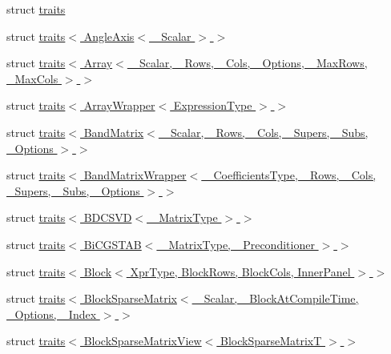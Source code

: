 \begin{DoxyCompactItemize}
\item 
struct \hyperlink{struct_eigen_1_1internal_1_1traits}{traits}
\item 
struct \hyperlink{struct_eigen_1_1internal_1_1traits_3_01_angle_axis_3_01___scalar_01_4_01_4}{traits$<$ Angle\+Axis$<$ \+\_\+\+Scalar $>$ $>$}
\item 
struct \hyperlink{struct_eigen_1_1internal_1_1traits_3_01_array_3_01___scalar_00_01___rows_00_01___cols_00_01___ope9eba6bf714e124241d092a6dc222cb7}{traits$<$ Array$<$ \+\_\+\+Scalar, \+\_\+\+Rows, \+\_\+\+Cols, \+\_\+\+Options, \+\_\+\+Max\+Rows, \+\_\+\+Max\+Cols $>$ $>$}
\item 
struct \hyperlink{struct_eigen_1_1internal_1_1traits_3_01_array_wrapper_3_01_expression_type_01_4_01_4}{traits$<$ Array\+Wrapper$<$ Expression\+Type $>$ $>$}
\item 
struct \hyperlink{struct_eigen_1_1internal_1_1traits_3_01_band_matrix_3_01___scalar_00_01___rows_00_01___cols_00_03762db5085b3b9896d5a124beda4837b}{traits$<$ Band\+Matrix$<$ \+\_\+\+Scalar, \+\_\+\+Rows, \+\_\+\+Cols, \+\_\+\+Supers, \+\_\+\+Subs, \+\_\+\+Options $>$ $>$}
\item 
struct \hyperlink{struct_eigen_1_1internal_1_1traits_3_01_band_matrix_wrapper_3_01___coefficients_type_00_01___row768e2717402a9eceb38d536f65ceb4f1}{traits$<$ Band\+Matrix\+Wrapper$<$ \+\_\+\+Coefficients\+Type, \+\_\+\+Rows, \+\_\+\+Cols, \+\_\+\+Supers, \+\_\+\+Subs, \+\_\+\+Options $>$ $>$}
\item 
struct \hyperlink{struct_eigen_1_1internal_1_1traits_3_01_b_d_c_s_v_d_3_01___matrix_type_01_4_01_4}{traits$<$ B\+D\+C\+S\+V\+D$<$ \+\_\+\+Matrix\+Type $>$ $>$}
\item 
struct \hyperlink{struct_eigen_1_1internal_1_1traits_3_01_bi_c_g_s_t_a_b_3_01___matrix_type_00_01___preconditioner_01_4_01_4}{traits$<$ Bi\+C\+G\+S\+T\+A\+B$<$ \+\_\+\+Matrix\+Type, \+\_\+\+Preconditioner $>$ $>$}
\item 
struct \hyperlink{struct_eigen_1_1internal_1_1traits_3_01_block_3_01_xpr_type_00_01_block_rows_00_01_block_cols_00_01_inner_panel_01_4_01_4}{traits$<$ Block$<$ Xpr\+Type, Block\+Rows, Block\+Cols, Inner\+Panel $>$ $>$}
\item 
struct \hyperlink{struct_eigen_1_1internal_1_1traits_3_01_block_sparse_matrix_3_01___scalar_00_01___block_at_compibd5ca3edcdbc62bf01222bcf3326c5bd}{traits$<$ Block\+Sparse\+Matrix$<$ \+\_\+\+Scalar, \+\_\+\+Block\+At\+Compile\+Time, \+\_\+\+Options, \+\_\+\+Index $>$ $>$}
\item 
struct \hyperlink{struct_eigen_1_1internal_1_1traits_3_01_block_sparse_matrix_view_3_01_block_sparse_matrix_t_01_4_01_4}{traits$<$ Block\+Sparse\+Matrix\+View$<$ Block\+Sparse\+Matrix\+T $>$ $>$}

\end{DoxyCompactItemize}
